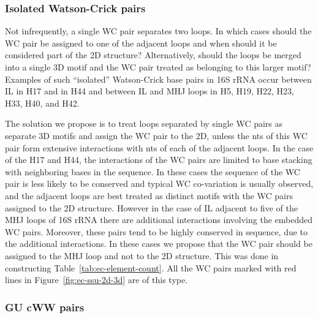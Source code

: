 \subsubsection{Isolated Watson-Crick pairs}

Not infrequently, a single WC pair separates two loops. In which cases should
the WC pair be assigned to one of the adjacent loops and when should it be
considered part of the 2D structure? Alternatively, should the loops be merged
into a single 3D motif and the WC pair treated as belonging to this larger
motif? Examples of such “isolated” Watson-Crick base pairs in 16S rRNA occur
between IL in H17 and in H44 and between IL and MHJ loops in H5, H19, H22, H23,
H33, H40, and H42. 

The solution we propose is to treat loops separated by single WC pairs as
separate 3D motifs and assign the WC pair to the 2D, unless the nts of this WC
pair form extensive interactions with nts of each of the adjacent loops. In the
case of the H17 and H44, the interactions of the WC pairs are limited to base
stacking with neighboring bases in the sequence. In these cases the sequence of
the WC pair is less likely to be conserved and typical WC co-variation is
usually observed, and the adjacent loops are best treated as distinct motifs
with the WC pairs assigned to the 2D structure. However in the case of IL
adjacent to five of the MHJ loops of 16S rRNA there are additional interactions
involving the embedded WC pairs. Moreover, these pairs tend to be highly
conserved in sequence, due to the additional interactions. In these cases we
propose that the WC pair should be assigned to the MHJ loop and not to the 2D
structure. This was done in constructing Table~\ref{tab:ec-element-count}. All
the WC pairs marked with red lines in Figure~\ref{fig:ec-ssu-2d-3d}  are of this
type. 

\subsubsection{GU cWW pairs}

